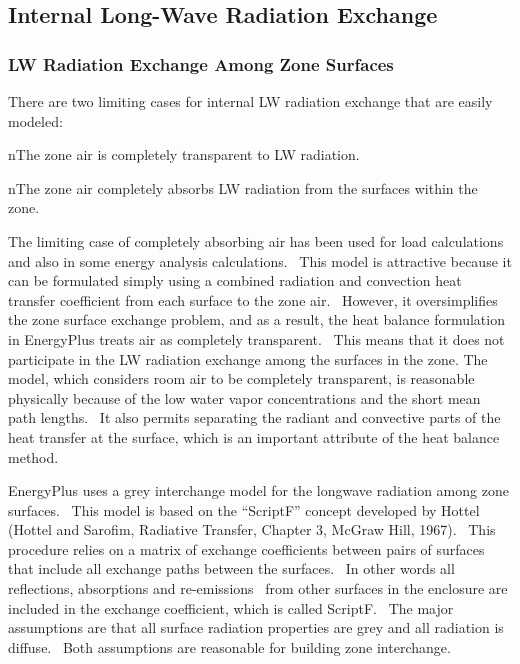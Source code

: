 \subsection{Internal Long-Wave Radiation Exchange}\label{internal-long-wave-radiation-exchange}

\subsubsection{LW Radiation Exchange Among Zone Surfaces}\label{lw-radiation-exchange-among-zone-surfaces}

There are two limiting cases for internal LW radiation exchange that are easily modeled:

nThe zone air is completely transparent to LW radiation.

nThe zone air completely absorbs LW radiation from the surfaces within the zone.

The limiting case of completely absorbing air has been used for load calculations and also in some energy analysis calculations.~ This model is attractive because it can be formulated simply using a combined radiation and convection heat transfer coefficient from each surface to the zone air.~ However, it oversimplifies the zone surface exchange problem, and as a result, the heat balance formulation in EnergyPlus treats air as completely transparent.~ This means that it does not participate in the LW radiation exchange among the surfaces in the zone. The model, which considers room air to be completely transparent, is reasonable physically because of the low water vapor concentrations and the short mean path lengths.~ It also permits separating the radiant and convective parts of the heat transfer at the surface, which is an important attribute of the heat balance method.

EnergyPlus uses a grey interchange model for the longwave radiation among zone surfaces.~ This model is based on the ``ScriptF'' concept developed by Hottel (Hottel and Sarofim, Radiative Transfer, Chapter 3, McGraw Hill, 1967).~ This procedure relies on a matrix of exchange coefficients between pairs of surfaces that include all exchange paths between the surfaces.~ In other words all reflections, absorptions and re-emissions~ from other surfaces in the enclosure are included in the exchange coefficient, which is called ScriptF.~ The major assumptions are that all surface radiation properties are grey and all radiation is diffuse.~ Both assumptions are reasonable for building zone interchange.

